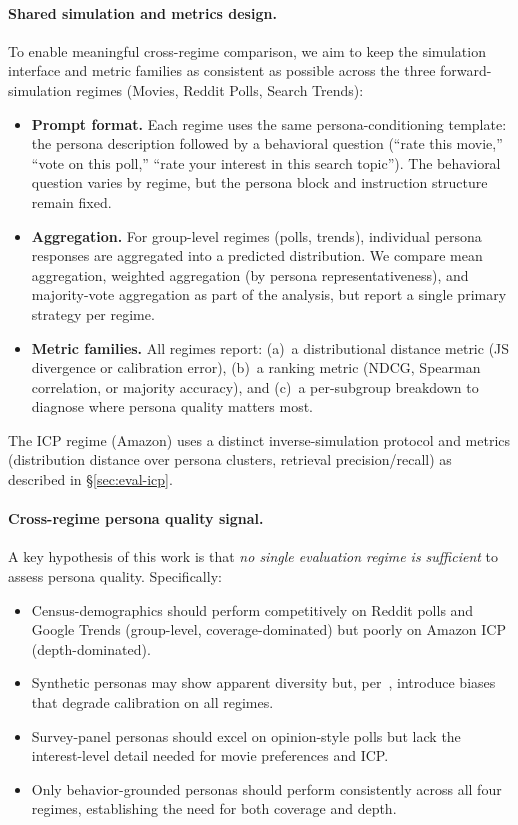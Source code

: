 \paragraph{Shared simulation and metrics design.}
To enable meaningful cross-regime comparison, we aim to keep the simulation interface and metric families as consistent as possible across the three forward-simulation regimes (Movies, Reddit Polls, Search Trends):
\begin{itemize}
    \item \textbf{Prompt format.} Each regime uses the same persona-conditioning template: the persona description followed by a behavioral question (``rate this movie,'' ``vote on this poll,'' ``rate your interest in this search topic''). The behavioral question varies by regime, but the persona block and instruction structure remain fixed.
    \item \textbf{Aggregation.} For group-level regimes (polls, trends), individual persona responses are aggregated into a predicted distribution. We compare mean aggregation, weighted aggregation (by persona representativeness), and majority-vote aggregation as part of the analysis, but report a single primary strategy per regime.
    \item \textbf{Metric families.} All regimes report: (a)~a distributional distance metric (JS divergence or calibration error), (b)~a ranking metric (NDCG, Spearman correlation, or majority accuracy), and (c)~a per-subgroup breakdown to diagnose where persona quality matters most.
\end{itemize}
The ICP regime (Amazon) uses a distinct inverse-simulation protocol and metrics (distribution distance over persona clusters, retrieval precision/recall) as described in \S\ref{sec:eval-icp}.

\paragraph{Cross-regime persona quality signal.}
A key hypothesis of this work is that \emph{no single evaluation regime is sufficient} to assess persona quality.
Specifically:
\begin{itemize}
    \item Census-demographics should perform competitively on Reddit polls and Google Trends (group-level, coverage-dominated) but poorly on Amazon ICP (depth-dominated).
    \item Synthetic personas may show apparent diversity but, per~\cite{li_llm_2025}, introduce biases that degrade calibration on all regimes.
    \item Survey-panel personas should excel on opinion-style polls but lack the interest-level detail needed for movie preferences and ICP.
    \item Only behavior-grounded personas should perform consistently across all four regimes, establishing the need for both coverage and depth.
\end{itemize}

